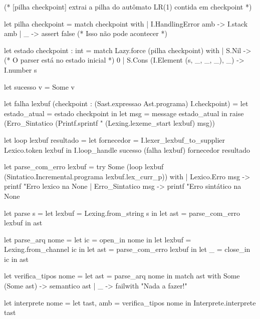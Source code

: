 \documentclass[12pt,a4paper,twoside]{article}
\begin{document}
\begin{terminal}
(* [pilha checkpoint] extrai a pilha do autômato LR(1) contida em checkpoint *)

let pilha checkpoint =
  match checkpoint with
  | I.HandlingError amb -> I.stack amb
  | _ -> assert false (* Isso não pode acontecer *)

let estado checkpoint : int =
  match Lazy.force (pilha checkpoint) with
  | S.Nil -> (* O parser está no estado inicial *)
     0
  | S.Cons (I.Element (s, _, _, _), _) ->
     I.number s

let sucesso v = Some v

let falha lexbuf (checkpoint : (Sast.expressao Ast.programa) I.checkpoint) =
  let estado_atual = estado checkpoint in
  let msg = message estado_atual in
  raise (Erro_Sintatico (Printf.sprintf "%
                                      (Lexing.lexeme_start lexbuf) msg))

let loop lexbuf resultado =
  let fornecedor = I.lexer_lexbuf_to_supplier Lexico.token lexbuf in
  I.loop_handle sucesso (falha lexbuf) fornecedor resultado


let parse_com_erro lexbuf =
  try
    Some (loop lexbuf (Sintatico.Incremental.programa lexbuf.lex_curr_p))
  with
  | Lexico.Erro msg ->
     printf "Erro lexico na %
     None
  | Erro_Sintatico msg ->
     printf "Erro sintático na %
     None

let parse s =
  let lexbuf = Lexing.from_string s in
  let ast = parse_com_erro lexbuf in
  ast

let parse_arq nome =
  let ic = open_in nome in
  let lexbuf = Lexing.from_channel ic in
  let ast = parse_com_erro lexbuf in
  let _ = close_in ic in
  ast

let verifica_tipos nome =
  let ast = parse_arq nome in
  match ast with
    Some (Some ast) -> semantico ast
  | _ -> failwith "Nada a fazer!\n"

let interprete nome =
  let tast, amb = verifica_tipos nome in
  Interprete.interprete tast
\end{terminal}
\end{document}
